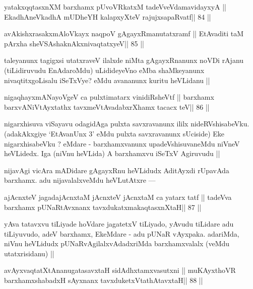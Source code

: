 \begin{shl}
yatakxqqtasxnXM barxhamx pUvoVRkatxM tadeVveVdamavidayxyA ||
EkadhA\s neVkadhA mUDheYH kalapxyXteV rajujxsapaRvatf\hfill || 84 ||
\end{shl}

\begin{shl}
avAkishxrasakxmAloVkayx naqpoV gAgayxRmanutatxramf ||
EtAvaditi taM pArxha sheVSAshaknAkxnivaqtatxyeV\hfill || 85 ||
\end{shl}

\begin{artha}
taleyanunx tagigxsi utatxraveV ilalxde niMta gAgayxRnanunx noVDi rAjanu (tiLidiruvudu EnAdaroMdu) uLidideyeVno eMba shaMkeyanunx nivaqtitxgoLisalu iSeTxVye? eMdu avananunx kuritu heVLidanu ||
\end{artha} 

\begin{shl}
nigaqhayxmANayoVgeV ca pulxtimatarx vinidiRsheVtf ||
barxhamx barxvANiVtAyxtathx tavxmeVtAvadabxrXhamx tacacx teV\hfill || 86 ||
\end{shl}

\begin{artha}
nigarxhisuva viSayavu odagidAga pulxta savxravanunx ililx 
nideRVshisabeVku. (adakAkxgiye `EtAvanUnx 3' eMdu pulxta savxravanunx 
sUciside) Eke nigarxhisabeVku ? eMdare - barxhamxvanunx upadeVshisuvaneMdu niVneV heVLidedx. Iga (niVnu heVLida) A barxhamxvu iSeTxV Agiruvudu ||
\end{artha}

\begin{artha}
nijavAgi vicAra mADidare gAgayxRnu heVLidudx AditAyxdi rUpavAda 
barxhamx. adu nijavalalxveMdu heVLutAtxre ---
\end{artha} 

\begin{shl}
ajAcnxteV jagadajAcnxtaM jAcnxteV jAcnxtaM ca yatarx tatf ||
tadeVva barxhamx pUNaRtAvxnanx tavxdukatxmakaqtasxnXtaH\hfill || 87 ||
\end{shl}

\begin{artha}
yAva tatavxvu tiLiyade hoVdare jagatetxV tiLiyado, yAvudu tiLidare adu 
tiLiyuvudo, adeV barxhamx, EkeMdare - adu pUNaR vAyxpaka. adariMda, niVnu heVLidudx pUNaRvAgilalxvAdadxriMda barxhamxvalalx (veMdu utatxrisidanu) ||
\end{artha}

\begin{shl}
avAyxvaqtatXtAnanugatasavxtaH sidAdhxtamxvasutxni ||
muKAyxthoVR barxhamxshabadxH sAyxnanx tavxduketxV\s tathAtavxtaH\hfill || 88 ||
\end{shl}

